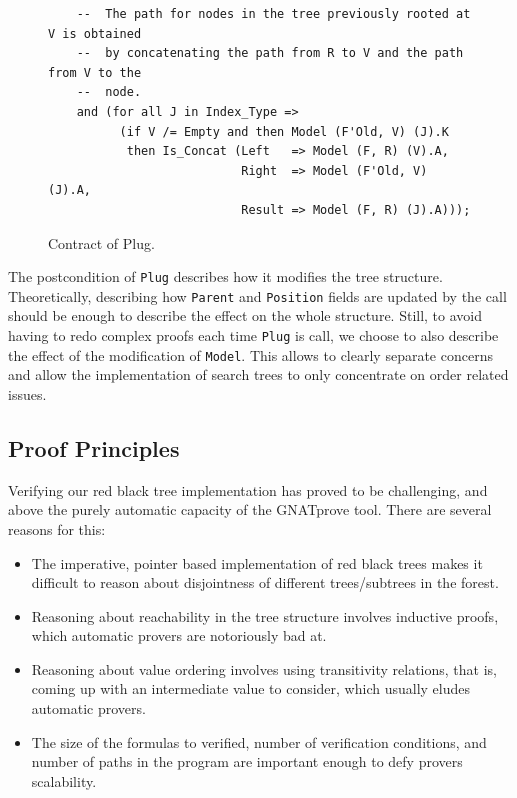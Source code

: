 \documentclass{llncs}
\newcommand{\gnatprove}{GNATprove\xspace}
\begin{document}
\begin{figure}
\begin{small}
\begin{lstlisting}
    --  The path for nodes in the tree previously rooted at V is obtained
    --  by concatenating the path from R to V and the path from V to the
    --  node.
    and (for all J in Index_Type =>
          (if V /= Empty and then Model (F'Old, V) (J).K
           then Is_Concat (Left   => Model (F, R) (V).A,
                           Right  => Model (F'Old, V) (J).A,
                           Result => Model (F, R) (J).A)));
\end{lstlisting}
\end{small}
\caption{\label{fig-spec-binary} Contract of Plug.}
\end{figure}

The postcondition of \texttt{Plug} describes how it modifies the tree structure. Theoretically,
describing how \texttt{Parent} and \texttt{Position} fields are updated by the call should be enough to
describe the effect on the whole structure. Still, to avoid having to redo complex
proofs each time \texttt{Plug} is call, we choose to also describe the effect of the modification
of \texttt{Model}. This allows to clearly separate concerns and allow
the implementation of search trees to only concentrate on order related issues.

\subsection{Proof Principles}


Verifying our red black tree implementation has proved to be challenging, and above the
purely automatic capacity of the \gnatprove tool. There are several reasons for this:

\begin{itemize}
 \item The imperative, pointer based implementation of red black trees makes it difficult
 to reason about disjointness of different trees/subtrees in the forest.
 \item Reasoning about reachability in the tree structure involves inductive proofs, which
 automatic provers are notoriously bad at.
 \item Reasoning about value ordering involves using transitivity relations, that is, coming
 up with an intermediate value to consider, which usually eludes automatic provers.
 \item The size of the formulas to verified, number of verification conditions, and number of
 paths in the program are important enough to defy provers scalability.
\end{itemize}
\end{document}
